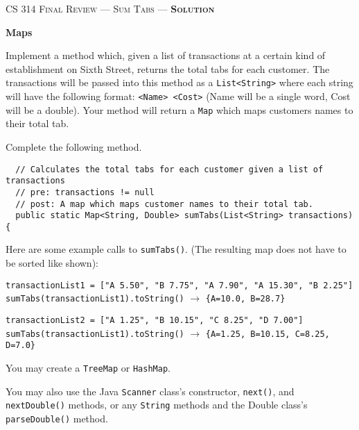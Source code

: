 \documentclass[12pt,letter]{article}
\begin{document}
\noindent\textsc{\large CS 314 Final Review --- Sum Tabs --- \textbf{Solution}}

\vspace{6pt}
\noindent\textbf{Maps}

\vspace{2pt}
\noindent Implement a method which, given a list of transactions at a certain kind of establishment on Sixth Street,
returns the total tabs for each customer. The transactions will be passed into this method as a \texttt{List<String>} where
each string will have the following format: \texttt{<Name> <Cost>} (Name will be a single word, Cost will be a double). 
Your method will return a \texttt{Map} which maps customers names to their total tab.

\vspace{4pt}
\noindent Complete the following method.
\begin{verbatim}
  // Calculates the total tabs for each customer given a list of transactions
  // pre: transactions != null
  // post: A map which maps customer names to their total tab.
  public static Map<String, Double> sumTabs(List<String> transactions) {
\end{verbatim}

\vspace{4pt}
\noindent Here are some example calls to \texttt{sumTabs()}. (The resulting map does not have to be sorted like shown):
\newline

\noindent \texttt{transactionList1 = ["A 5.50", "B 7.75", "A 7.90", "A 15.30", "B 2.25"]} \newline
\noindent \texttt{sumTabs(transactionList1).toString()} $\rightarrow$ \texttt{\{A=10.0, B=28.7\}} \newline

\noindent \texttt{transactionList2 = ["A 1.25", "B 10.15", "C 8.25", "D 7.00"]} \newline
\noindent \texttt{sumTabs(transactionList1).toString()} $\rightarrow$ \texttt{\{A=1.25, B=10.15, C=8.25, D=7.0\}} \newline

\noindent You may create a \texttt{TreeMap} or \texttt{HashMap}. 

\noindent You may also use the Java \texttt{Scanner} class's constructor, \texttt{next()}, and \texttt{nextDouble()} methods,
or any \texttt{String} methods and the Double class's \texttt{parseDouble()} method. \newline
\end{document}
